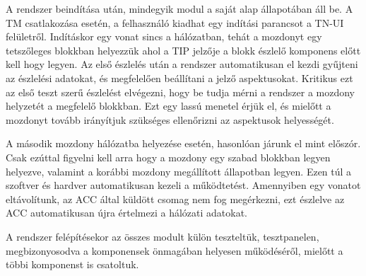 \documentclass[a4paper,12pt]{article}
\begin{document}
A rendszer beindítása után, mindegyik modul a saját alap állapotában áll be. 
A TM csatlakozása esetén, a felhasználó kiadhat egy indítási parancsot a TN-UI felületről. 
Indításkor egy vonat sincs a hálózatban, tehát a mozdonyt egy tetszőleges blokkban helyezzük ahol a TIP jelzője a blokk észlelő komponens előtt kell hogy legyen.
Az első észlelés után a rendszer automatikusan el kezdi gyűjteni az észlelési adatokat, és megfelelően beállítani a jelző aspektusokat. Kritikus ezt az első teszt szerű észlelést elvégezni, hogy be tudja mérni a rendszer a mozdony helyzetét a megfelelő blokkban. Ezt egy lassú menetel érjük el, és mielőtt a mozdonyt tovább irányítjuk szükséges ellenőrizni az aspektusok helyességét.

A második mozdony hálózatba helyezése esetén, hasonlóan járunk el mint előszór.
Csak ezúttal figyelni kell arra hogy a mozdony egy szabad blokkban legyen helyezve, valamint a korábbi mozdony megállított állapotban legyen.
Ezen túl a szoftver és hardver automatikusan kezeli a működtetést. 
Amennyiben egy vonatot eltávolítunk, az ACC által küldött csomag nem fog megérkezni, ezt észlelve az ACC automatikusan újra értelmezi a hálózati adatokat.

A rendszer felépítésekor az összes modult külön teszteltük, tesztpanelen, megbizonyosodva a komponensek önmagában helyesen működéséről, mielőtt a többi komponenst is csatoltuk.
\end{document}
